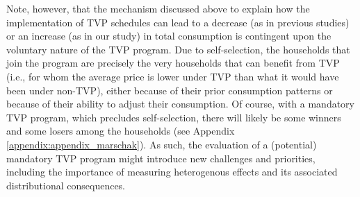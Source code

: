 \documentclass[12pt]{article}
\begin{document}
Note, however, that the mechanism discussed above to explain how the implementation of TVP schedules can lead to a decrease (as in previous studies) or an increase (as in our study) in total consumption is contingent upon the voluntary nature of the TVP program. Due to self-selection, the households that join the program are precisely the very households that can benefit from TVP (i.e., for whom the average price is lower under TVP than what it would have been under non-TVP), either because of their prior consumption patterns or because of their ability to adjust their consumption. Of course, with a mandatory TVP program, which precludes self-selection, there will likely be some winners and some losers among the households (see Appendix \ref{appendix:appendix_marschak}). As such, the evaluation of a (potential) mandatory TVP program might introduce new challenges and priorities, including the importance of measuring heterogenous effects and its associated distributional consequences.
\end{document}
